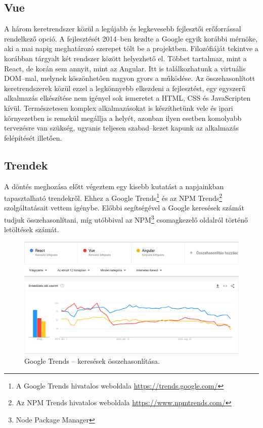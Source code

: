 \subsection{Vue}
A három keretrendszer közül a legújabb és legkevesebb fejlesztői erőforrással rendelkező opció.
A fejlesztését 2014–ben kezdte a Google egyik korábbi mérnöke, aki a mai napig meghatározó szerepet tölt be a projektben\cite{Vue}.
Filozófiáját tekintve a korábban tárgyalt két rendszer között helyezhető el. Többet tartalmaz, mint a React, de korán sem annyit, mint az Angular. Itt is találkozhatunk a virtuális DOM–mal, melynek köszönhetően nagyon gyors a működése.
Az összehasonlított keretrendszerek közül ezzel a legkönnyebb elkezdeni a fejlesztést, egy egyszerű alkalmazás elkészítése nem igényel sok ismeretet a HTML, CSS és JavaScripten kívül. Természetesen komplex alkalmazásokat is készíthetünk vele és ipari környezetben is remekül megállja a helyét, azonban ilyen esetben komolyabb tervezésre van szükség, ugyanis teljesen szabad–kezet kapunk az alkalmazás felépítését illetően.

\subsection{Trendek}
A döntés meghozása előtt végeztem egy kisebb kutatást a napjainkban tapasztalható trendekről. Ehhez a Google Trends\footnote{A Google Trends hivatalos weboldala \url{https://trends.google.com/}} és az NPM Trends\footnote{Az NPM Trends hivatalos weboldala \url{https://www.npmtrends.com/}}  szolgáltatásait vettem igénybe. Előbbi segítségével a Google keresések számát tudjuk összehasonlítani, míg utóbbival az NPM\footnote{Node Package Manager} csomagkezelő oldalról történő letöltések számát.

\begin{figure}[!ht]
  \centering
  \includegraphics[width=150mm, keepaspectratio]{figures/google_trends.png}
  \caption{Google Trends – keresések összehasonlítása.}
  \label{fig:GoogleTrends}
\end{figure}

